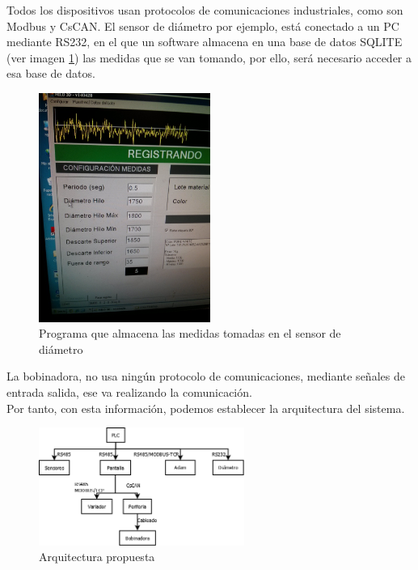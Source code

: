 Todos los dispositivos usan protocolos de comunicaciones industriales, como son Modbus y CsCAN. El sensor de diámetro por ejemplo, está conectado a un PC mediante 
RS232, en el que un software almacena en una base de datos SQLITE (ver imagen \ref{fig:hardware_sensor_diametro}) las medidas que se van tomando, por ello, será necesario acceder a esa base de datos.
 	\begin{figure}[H]
            \centering
            \includegraphics[width=0.5\textwidth]{images/Parametros_adquisicin.jpg}
            \caption{Programa que almacena las medidas tomadas en el sensor de diámetro}
            \label{fig:hardware_sensor_diametro}
    \end{figure}

La bobinadora, no usa ningún protocolo de comunicaciones, mediante señales de entrada salida, ese va realizando la comunicación.\\

Por tanto, con esta información, podemos establecer la arquitectura del sistema.\\

 	\begin{figure}[H]
            \centering
            \includegraphics[width=0.6\textwidth]{images/20141229.png}
            \caption{Arquitectura propuesta}
            \label{fig:hardware_arquitectura}
    \end{figure}

